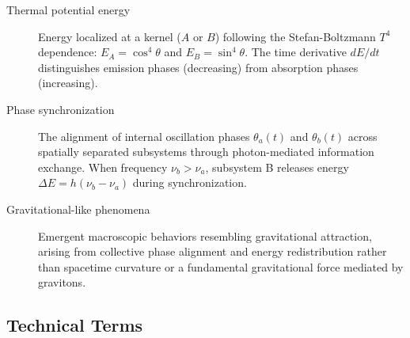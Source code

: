 \documentclass[12pt,letterpaper]{article}
\begin{document}
\begin{description}
\item[Thermal potential energy] Energy localized at a kernel ($A$ or $B$) following the Stefan-Boltzmann $T^4$ dependence: $E_A = \cos^4\theta$ and $E_B = \sin^4\theta$. The time derivative $dE/dt$ distinguishes emission phases (decreasing) from absorption phases (increasing).

\item[Phase synchronization] The alignment of internal oscillation phases $\theta_a(t)$ and $\theta_b(t)$ across spatially separated subsystems through photon-mediated information exchange. When frequency $\nu_b > \nu_a$, subsystem B releases energy $\Delta E = h(\nu_b - \nu_a)$ during synchronization.

\item[Gravitational-like phenomena] Emergent macroscopic behaviors resembling gravitational attraction, arising from collective phase alignment and energy redistribution rather than spacetime curvature or a fundamental gravitational force mediated by gravitons.

\end{description}


\subsection*{Technical Terms}
\end{document}
